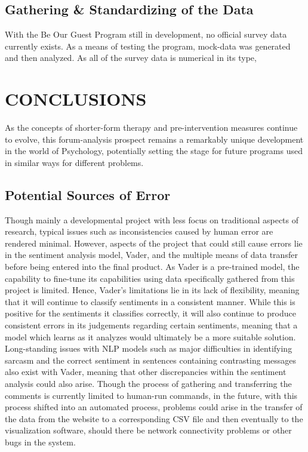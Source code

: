 \documentclass[letterpaper, 12 pt, conference]{ieeeconf}
\begin{document}
\subsection{Gathering \& Standardizing of the Data}

With the Be Our Guest Program still in development, no official survey data currently exists. As a means of testing the program, mock-data was generated and then analyzed. As all of the survey data is numerical in its type, 



\section{CONCLUSIONS}

As the concepts of shorter-form therapy and pre-intervention measures continue to evolve, this forum-analysis prospect remains a remarkably unique development in the world of Psychology, potentially setting the stage for future programs used in similar ways for different problems. 

\subsection{Potential Sources of Error}

Though mainly a developmental project with less focus on traditional aspects of research, typical issues such as inconsistencies caused by human error are rendered minimal. However, aspects of the project that could still cause errors lie in the sentiment analysis model, Vader, and the multiple means of data transfer before being entered into the final product. As Vader is a pre-trained model, the capability to fine-tune its capabilities using data specifically gathered from this project is limited. Hence, Vader's limitations lie in its lack of flexibility, meaning that it will continue to classify sentiments in a consistent manner. While this is positive for the sentiments it classifies correctly, it will also continue to produce consistent errors in its judgements regarding certain sentiments, meaning that a model which learns as it analyzes would ultimately be a more suitable solution. Long-standing issues with NLP models such as major difficulties in identifying sarcasm and the correct sentiment in sentences containing contrasting messages also exist with Vader, meaning that other discrepancies within the sentiment analysis could also arise. Though the process of gathering and transferring the comments is currently limited to human-run commands, in the future, with this process shifted into an automated process, problems could arise in the transfer of the data from the website to a corresponding CSV file and then eventually to the visualization software, should there be network connectivity problems or other bugs in the system. 
\end{document}
